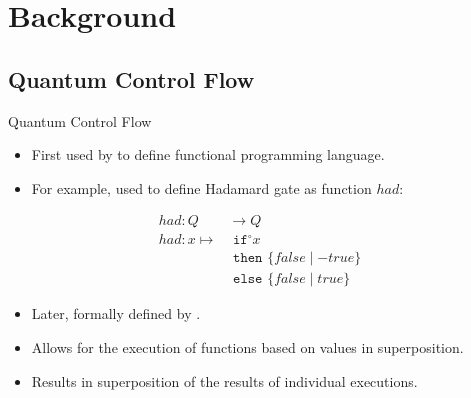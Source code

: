 \section{Background}
\subsection{Quantum Control Flow}
\begin{frame}{Quantum Control Flow}
    \begin{itemize}
        \item First used by \cite{AlGr05} to define functional programming language.
        \item For example, used to define Hadamard gate as function $had$:  
    \end{itemize}
    \begin{align*}
        had : Q& \to Q\\
        had : x \mapsto& \texttt{ if}^\circ x\\
                       & \texttt{ then } \{false \mid -true\}\\
                       & \texttt{ else } \{false \mid true\}
    \end{align*}
    \begin{itemize}
        \item Later, formally defined by \cite{YYF12}.
        \item Allows for the execution of functions based on values in superposition.
        \item Results in superposition of the results of individual executions.
    \end{itemize}
\end{frame}

